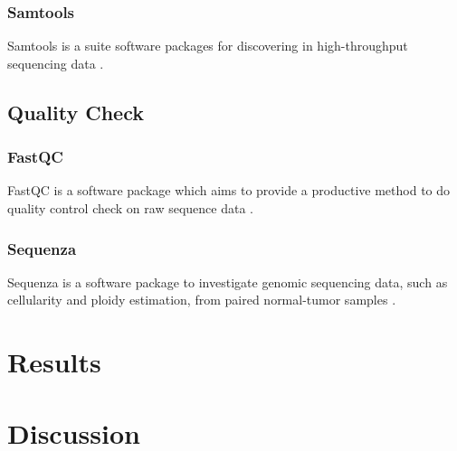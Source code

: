 \documentclass[a4paper]{article}
\begin{document}
            \subsubsection{Samtools}
                Samtools is a suite software packages for discovering in high-throughput sequencing data \cite{samtools1}.

        \subsection{Quality Check}
            \subsubsection{FastQC}
                FastQC is a software package which aims to provide a productive method to do quality control check on raw sequence data \cite{fastqc1}.

            \subsubsection{Sequenza}
                Sequenza is a software package to investigate genomic sequencing data, such as cellularity and ploidy estimation, from paired normal-tumor samples \cite{sequenza1}.

    \section{Results}

    \section{Discussion}

    
    
\end{document}
